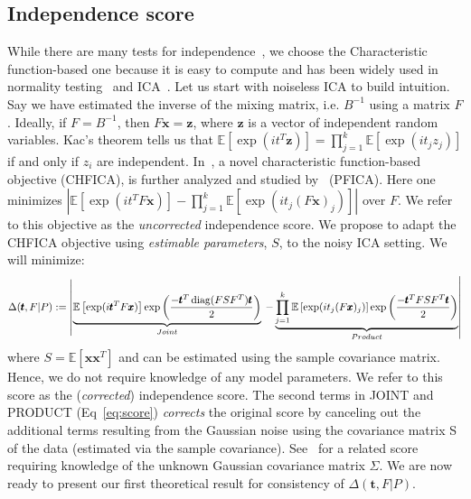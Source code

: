 \documentclass[letterpaper]{article}
\newcommand{\ba}[1]{\begin{align}#1\end{align}}
\newcommand{\bx}{\pmb{x}}
\newcommand{\bt}{\pmb{t}}
\newcommand{\bz}{\pmb{z}}
\newcommand{\bk}{\color{black}}
\newcommand{\E}{\mathbb{E}}
\newcommand{\bb}[1]{\left(#1\right)}
\newcommand{\bbb}[1]{\left[#1\right]}
\DeclareMathOperator{\diag}{diag}
\begin{document}
\subsection{Independence score}
\label{subsection:nonparametric_score}
While there are many tests for independence~\cite{gretton2007kernelindependence,kirshner2008ICA,hao2009kernel,bach2003kernel}, we choose the Characteristic function-based one because it is easy to compute and has been widely used in normality testing~\cite{ebner2021bahadur,ebner2023eigenvalues,HENZE19971} and ICA~\cite{chen2005ICA,ERIKSSON20032195,fabian2005chf}.
\bk
Let us start with noiseless ICA to build intuition. Say we have estimated the inverse of the mixing matrix, i.e. $B^{-1}$ using a matrix $F$. Ideally, if $F=B^{-1}$, then $F\bx=\bz$, where $\bz$ is a vector of independent random variables. Kac's theorem \cite{Kac1936SurLF} tells us that
$\E\bbb{\exp(it^T\bz)}=\prod_{j=1}^k \E\bbb{\exp(it_jz_j)}$ if and only if $z_i$ are independent. In~\cite{ERIKSSON20032195}, a novel characteristic function-based objective (CHFICA), is further analyzed and studied by~\cite{chen2005ICA} (PFICA). Here one minimizes $|\E\bbb{\exp(it^TF\bx)}-\prod_{j=1}^k\E\bbb{\exp(i t_j (F\bx)_j)}|$ over $F$. We refer to this objective as the \textit{uncorrected} independence score.
We propose to adapt the CHFICA objective using \textit{estimable parameters}, $S$, to the noisy ICA setting. We will minimize:
{\small
\ba{\label{eq:score}
\Delta(\bt,F|P):=\left|\underbrace{\E\bbb{\exp(i\bt^TF\bx)}\exp\bb{\frac{-\bt^T\diag(F S F^T)\bt}{2}}}_{\textsc{Joint}}\right.
\left.-\underbrace{\prod_{j=1}^k\E\bbb{\exp(i t_j (F\bx)_j)}\exp\bb{\frac{-\bt^TFS F^T\bt}{2}}}_{\textsc{Product}}\right|
}
}
where $S=\E[\bx\bx^T]$ and can be estimated using the sample covariance matrix. Hence, we do not require knowledge of any model parameters. 
We refer to this score as the (\textit{corrected}) independence score. The second terms in JOINT and PRODUCT (Eq~\ref{eq:score}) \textit{corrects} the original score by canceling out the additional terms resulting from the Gaussian noise using the covariance matrix S of the data (estimated via the sample covariance). %
See~\cite{ERIKSSON20032195} for a related score requiring knowledge of the unknown Gaussian covariance matrix $\Sigma$. 
We are now ready to present our first theoretical result for consistency of $\Delta(\bt,F|P)$.
\end{document}
